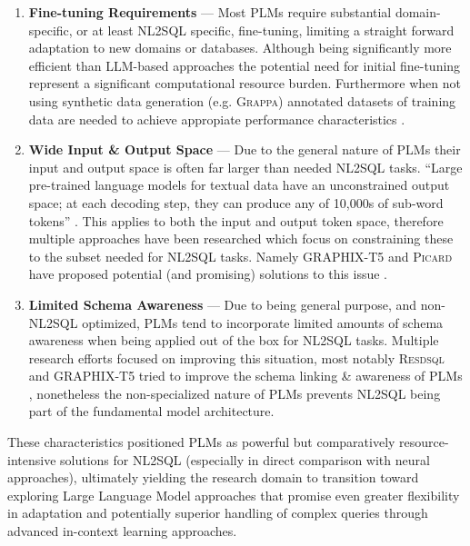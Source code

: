 \begin{enumerate}

    \item \textbf{Fine-tuning Requirements} — Most PLMs require substantial domain-specific, or at least NL2SQL specific,
          fine-tuning, limiting a straight forward adaptation to new domains or databases. Although being significantly
          more efficient than LLM-based approaches the potential need for initial fine-tuning represent a significant
          computational resource burden. Furthermore when not using synthetic data generation (e.g. \textsc{Grappa})
          annotated datasets of training data are needed to achieve appropiate performance characteristics \citep{GRAPPA}.
    \item \textbf{Wide Input \& Output Space} — Due to the general nature of PLMs their input and output space is often
          far larger than needed 
          NL2SQL tasks. ``Large pre-trained language models for textual data have an unconstrained output space; at each
          decoding step, they can produce any of 10,000s of sub-word tokens'' \citep{PICARD}. This applies to both the
          input and output token space, therefore multiple approaches have been researched which focus on constraining
          these to the subset needed for NL2SQL tasks. Namely GRAPHIX-T5 and \textsc{Picard} have proposed potential
          (and promising) solutions to this issue \citep{GRAPHIX, PICARD}.
    \item \textbf{Limited Schema Awareness} — Due to being general purpose, and non-NL2SQL optimized, PLMs tend to
          incorporate limited amounts of schema awareness when being applied out of the box for NL2SQL tasks. Multiple
          research efforts focused on improving this situation, most notably \textsc{Resdsql} and GRAPHIX-T5 tried to
          improve the schema linking \& awareness of PLMs \citep{RESDSQL, GRAPHIX}, nonetheless the non-specialized nature
          of PLMs prevents NL2SQL being part of the fundamental model architecture.
\end{enumerate}

These characteristics positioned PLMs as powerful but comparatively resource-intensive solutions for NL2SQL (especially
in direct comparison with neural approaches), ultimately yielding the research domain to transition toward exploring
Large Language Model approaches that promise even greater flexibility in adaptation and potentially superior handling
of complex queries through advanced in-context learning approaches.


